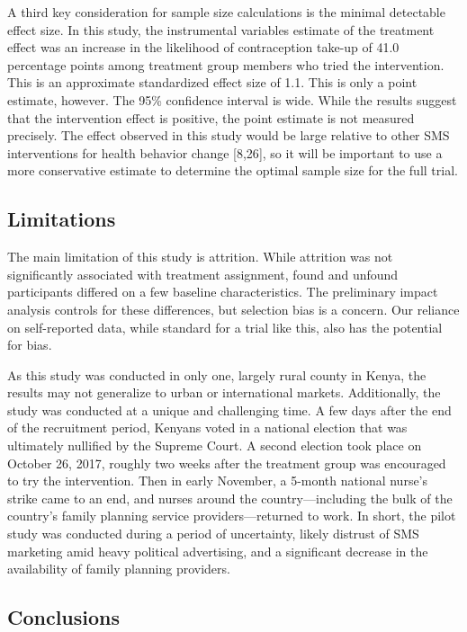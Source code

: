 \documentclass[man]{apa6}
\theoremstyle{definition}
\theoremstyle{definition}
\theoremstyle{definition}
\theoremstyle{remark}
\begin{document}
A third key consideration for sample size calculations is the minimal
detectable effect size. In this study, the instrumental variables
estimate of the treatment effect was an increase in the likelihood of
contraception take-up of 41.0 percentage points among treatment group
members who tried the intervention. This is an approximate standardized
effect size of 1.1. This is only a point estimate, however. The 95\%
confidence interval is wide. While the results suggest that the
intervention effect is positive, the point estimate is not measured
precisely. The effect observed in this study would be large relative to
other SMS interventions for health behavior change {[}8,26{]}, so it
will be important to use a more conservative estimate to determine the
optimal sample size for the full trial.

\hypertarget{limitations}{%
\subsection{Limitations}\label{limitations}}

The main limitation of this study is attrition. While attrition was not
significantly associated with treatment assignment, found and unfound
participants differed on a few baseline characteristics. The preliminary
impact analysis controls for these differences, but selection bias is a
concern. Our reliance on self-reported data, while standard for a trial
like this, also has the potential for bias.

As this study was conducted in only one, largely rural county in Kenya,
the results may not generalize to urban or international markets.
Additionally, the study was conducted at a unique and challenging time.
A few days after the end of the recruitment period, Kenyans voted in a
national election that was ultimately nullified by the Supreme Court. A
second election took place on October 26, 2017, roughly two weeks after
the treatment group was encouraged to try the intervention. Then in
early November, a 5-month national nurse's strike came to an end, and
nurses around the country---including the bulk of the country's family
planning service providers---returned to work. In short, the pilot study
was conducted during a period of uncertainty, likely distrust of SMS
marketing amid heavy political advertising, and a significant decrease
in the availability of family planning providers.

\hypertarget{conclusions}{%
\subsection{Conclusions}\label{conclusions}}
\end{document}

